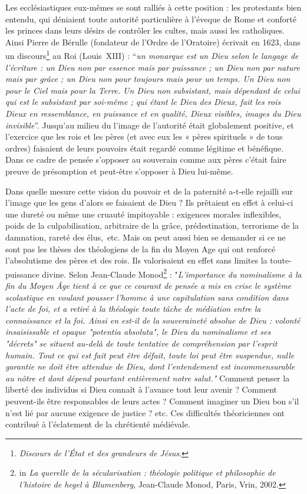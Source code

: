 Les ecclésiastiques eux-mêmes se sont ralliés à cette position : les protestants bien entendu, qui déniaient toute autorité particulière à l'éveque de Rome et conforté les princes dans leurs désirs de contrôler les cultes, mais aussi les catholiques. Ainsi Pierre de Bérulle (fondateur de l'Ordre de l'Oratoire) écrivait en 1623, dans un discours\footnote{\emph{Discours de l'État et des grandeurs de Jésus}.} au Roi (Louis~XIII)  :
    \enquote{\emph{un monarque est un Dieu selon le langage de l'écriture : un Dieu non par essence mais par puissance ; un Dieu non par nature mais par grâce ; un Dieu non pour toujours mais pour un temps. Un Dieu non pour le Ciel mais pour la Terre. Un Dieu non subsistant, mais dépendant de celui qui est le subsistant par soi-même ; qui étant le Dieu des Dieux, fait les rois Dieux en ressemblance, en puissance et en qualité, Dieux visibles, images du Dieu invisible}}. Jusqu'au milieu du  l'image de l'autorité était globalement positive, et l'exercice que les rois et les pères (et avec eux les « pères spirituels » de tous ordres) faisaient de leurs pouvoirs était regardé comme légitime et bénéfique. Dans ce cadre de pensée s'opposer au souverain comme aux pères c'était faire preuve de présomption et peut-être s'opposer à Dieu lui-même. 
    
    
    Dans quelle mesure cette vision du pouvoir et de la paternité a-t-elle rejailli sur l'image que les gens d'alors se faisaient de Dieu ? Ils prêtaient en effet à celui-ci une dureté ou même une cruauté impitoyable : exigences morales inflexibles, poids de la culpabilisation, arbitraire de la grâce, prédestination, terrorisme de la damnation, rareté des élus,~etc. Mais on peut aussi bien se demander si ce ne sont pas les thèses des théologiens de la fin du Moyen Age qui ont renforcé l'absolutisme des pères et des rois. Ils valorisaient en effet sans limites la toute-puissance divine. Selon Jean-Claude Monod\footnote{ in \emph{La querelle de la sécularisation : théologie politique et philosophie de l'histoire de hegel à Blumenberg}, Jean-Claude Monod, Paris, Vrin, 2002.} : "\emph{L'importance du nominalisme à la fin du Moyen Âge tient à ce que ce courant de pensée a mis en crise le système scolastique en voulant pousser l'homme à une capitulation sans condition dans l'acte de foi, et a retiré à la théologie toute tâche de médiation entre la connaissance et la foi. Ainsi en est-il de la souveraineté absolue de Dieu : volonté insaisissable et opaque "potentia absoluta", le Dieu du nominalisme et ses "décrets" se situent au-delà de toute tentative de compréhension par l'esprit humain. Tout ce qui est fait peut être défait, toute loi peut être suspendue, nulle garantie ne doit être attendue de Dieu, dont l'entendement est incommensurable au nôtre et dont dépend pourtant entièrement notre salut."} Comment penser la liberté des individus si Dieu connaît à l'avance tout leur avenir ? Comment peuvent-ils être responsables de leurs actes ? Comment imaginer un Dieu bon s'il n'est lié par aucune exigence de justice ? etc. Ces difficultés théoriciennes ont contribué à l'éclatement de la chrétienté médiévale.       
    
